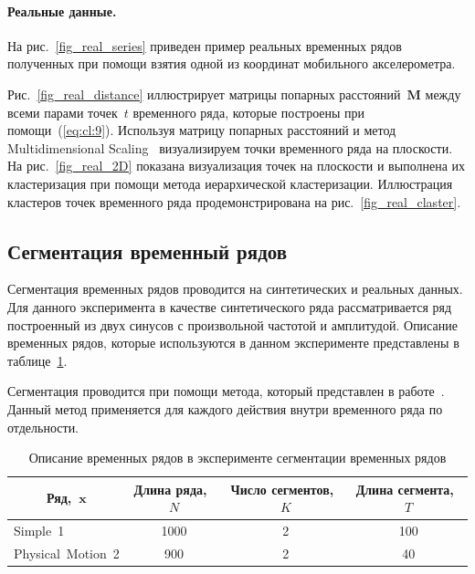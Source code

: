 \documentclass[12pt, twoside]{article}
\numberwithin{equation}{section}
\begin{document}
\paragraph{Реальные данные.}

На рис.~\ref{fig_real_series} приведен пример реальных временных рядов полученных при помощи взятия одной из координат мобильного акселерометра. 

Рис.~\ref{fig_real_distance} иллюстрирует матрицы попарных расстояний~$\textbf{M}$ между всеми парами точек~$t$ временного ряда, которые построены при помощи~(\ref{eq:cl:9}). 
Используя матрицу попарных расстояний и метод Multidimensional Scaling~\cite{Borg2005} визуализируем точки временного ряда на плоскости. 
На рис.~\ref{fig_real_2D} показана визуализация точек на плоскости и выполнена их кластеризация при помощи метода иерархической кластеризации. 
Иллюстрация кластеров точек временного ряда продемонстрирована на рис.~\ref{fig_real_claster}.

\subsection{Сегментация временный рядов}
Сегментация временных рядов проводится на синтетических и реальных данных. Для данного эксперимента в качестве синтетического ряда рассматривается ряд построенный из двух синусов с произвольной частотой и амплитудой. Описание временных рядов, которые используются в данном эксперименте представлены в таблице~\ref{table:3}.

Сегментация проводится при помощи метода, который представлен в работе~\cite{motrenko2015}. Данный метод применяется для каждого действия внутри временного ряда по отдельности.


\begin{table}[h!t]
\begin{center}
\caption{Описание временных рядов в эксперименте сегментации временных рядов}
\label{table:3}
\begin{tabular}{|c|c|c|c|}
\hline
	Ряд,~$\textbf{x}$ &Длина ряда,~$N$& Число сегментов,~$K$&Длина сегмента,~$T$\\
	\hline
	\multicolumn{1}{|l|}{Simple~1}
	& 1000& 2& 100\\
	\hline
	\multicolumn{1}{|l|}{Physical~Motion~2}
	& 900& 2& 40\\
\hline

\end{tabular}
\end{center}
\end{table}
\end{document}
